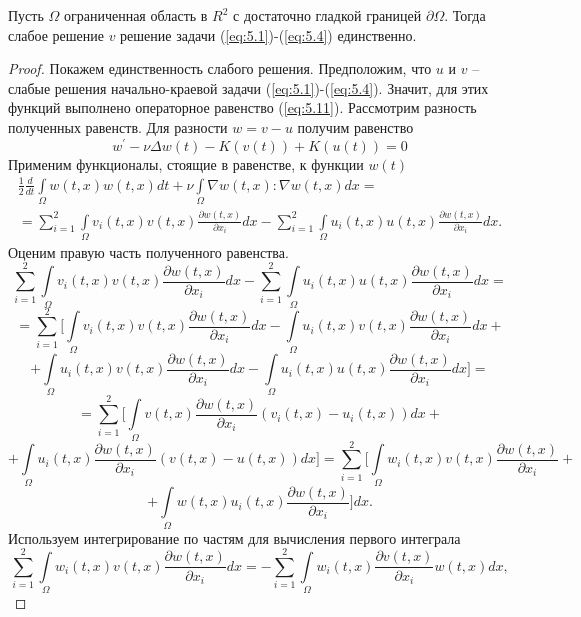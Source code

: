 \begin{theorem}
    Пусть $\Omega$ ограниченная область в $R^2$ с достаточно гладкой границей $\partial\Omega$. Тогда слабое решение $v$  решение
    задачи (\ref{eq:5.1})-(\ref{eq:5.4}) единственно.
\end{theorem}
\begin{proof}
    Покажем единственность слабого решения. Предположим, что $u$ и $v$ -- слабые решения начально-краевой задачи (\ref{eq:5.1})-(\ref{eq:5.4}).
    Значит, для этих функций выполнено операторное равенство (\ref{eq:5.11}). Рассмотрим разность полученных равенств.
    Для разности $w = v - u$ получим равенство
    $$w^\prime - \nu\Delta w(t) - K(v(t)) + K(u(t)) = 0$$
    Применим функционалы, стоящие в равенстве, к функции $w(t)$
    \begin{equation}\label{eq:5.36}
        \begin{gathered}
            \frac{1}{2}\frac{d}{dt}\int\limits_\Omega w(t, x)w(t, x)dt+\nu\int\limits_{\Omega} \nabla w(t,x):\nabla w(t,x)dx= \\
            =\sum_{i=1}^{2}\int\limits_\Omega v_i(t,x) v(t, x)\frac{\partial w(t, x)}{\partial x_i}dx-\sum_{i=1}^{2}\int\limits_\Omega u_i(t,x)u(t, x)\frac{\partial w(t, x)}{\partial x_i}dx.
        \end{gathered}
    \end{equation}
    Оценим правую часть полученного равенства.
    $$\sum_{i=1}^{2}\int\limits_\Omega v_i(t,x) v(t, x)\frac{\partial w(t, x)}{\partial x_i}dx-
    \sum_{i=1}^{2}\int\limits_\Omega u_i(t,x)u(t, x)\frac{\partial w(t, x)}{\partial x_i}dx=$$
    $$=\sum_{i=1}^{2}\bigg[\int\limits_\Omega v_i(t,x)v(t, x)\frac{\partial w(t, x)}{\partial x_i}dx-
    \int\limits_\Omega u_i(t,x)v(t, x)\frac{\partial w(t, x)}{\partial x_i}dx+$$
    $$+\int\limits_\Omega u_i(t,x) v(t, x)\frac{\partial w(t, x)}{\partial x_i}dx-
    \int\limits_\Omega u_i(t,x) u(t, x)\frac{\partial w(t, x)}{\partial x_i}dx\bigg]=$$
    $$=\sum_{i=1}^{2}\bigg[\int\limits_\Omega v(t, x)\frac{\partial w(t, x)}{\partial x_i}(v_i(t,x)-u_i(t,x))dx+$$
    $$+\int\limits_\Omega u_i(t,x) \frac{\partial w(t, x)}{\partial x_i}(v(t,x)-u(t,x))dx\bigg]=
    \sum_{i=1}^{2}\bigg[\int\limits_\Omega w_i(t,x)v(t,x)\frac{\partial w(t, x)}{\partial x_i}+$$
    $$+\int\limits_\Omega w(t,x)u_i(t,x)\frac{\partial w(t, x)}{\partial x_i}\bigg]dx.$$
    Используем интегрирование по частям для вычисления первого интеграла
    $$\sum_{i=1}^{2}\int\limits_\Omega w_i(t, x)v(t, x)\frac{\partial w(t, x)}{\partial x_i}dx=
    -\sum_{i=1}^{2}\int\limits_\Omega w_i(t, x)\frac{\partial v(t, x)}{\partial x_i}w(t, x)dx,$$

\end{proof}
